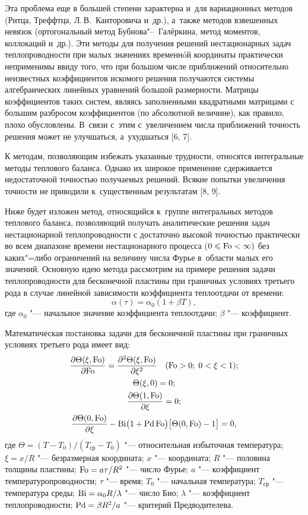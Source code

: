 Эта проблема еще в большей степени характерна и~для вариационных методов 
(Ритца, Треффтца, Л.\,В.~Канторовича и~др.), а~также методов взвешенных невязок 
(ортогональный метод Бубнова"--~Галёркина, метод моментов, коллокаций и~др.). 
Эти методы для получения решений нестационарных задач теплопроводности при 
малых значениях временн\'{o}й координаты практически неприменимы ввиду того, 
что при большом числе приближений относительно неизвестных коэффициентов 
искомого решения получаются системы алгебраических линейных уравнений 
большой размерности. Матрицы коэффициентов таких систем, являясь 
заполненными квадратными матрицами с большим разбросом коэффициентов (по 
абсолютной величине), как правило, плохо обусловлены. В~связи с~этим с~увеличением числа приближений точность решения может не улучшаться, а~ухудшаться [6, 7]. 

К методам, позволяющим избежать указанные трудности, относятся интегральные 
методы теплового баланса. Однако их широкое применение сдерживается 
недостаточной точностью получаемых решений. Всякие попытки увеличения 
точности не приводили к~существенным результатам [8, 9].

Ниже будет изложен метод, относящийся к~группе интегральных методов 
теплового баланса, позволяющий получать аналитические решения задач 
нестационарной теплопроводности с достаточно высокой точностью практически 
во всем диапазоне времени нестационарного процесса 
($0\leqslant {\rm Fo}<\infty )$ без каких"=либо ограничений на величину числа Фурье в~области 
малых его значений. Основную идею метода рассмотрим на примере решения 
задачи теплопроводности для бесконечной пластины при граничных условиях 
третьего рода в случае линейной зависимости коэффициента теплоотдачи от 
времени:
\[
\alpha (\tau)=\alpha _0 ( 1+\beta T),
\]
где $\alpha _0 $ "--- начальное значение коэффициента теплоотдачи; $\beta $ "--- 
коэффициент.

Математическая постановка задачи для бесконечной пластины при граничных 
условиях третьего рода имеет вид:
\begin{gather}
\frac{\partial \Theta (\xi, {\rm Fo})}{\partial {\rm Fo}}=
\frac{\partial^2\Theta (\xi, {\rm Fo})}{\partial \xi ^2}\quad  ({\rm Fo}>0;\; 
0<\xi <1);\\
\label{stef-eq1}
\Theta (\xi, 0)=0;
\\
\label{stef-eq2}
\frac{\partial \Theta (1, {\rm Fo} ) }{\partial \xi }=0;
\\
\label{stef-eq3}
\frac{\partial \Theta (0, {\rm Fo})} {\partial \xi }-
{\rm Bi}\bigl(1+{\rm Pd}\,{\rm Fo}\bigr)\bigl[\Theta ( 0, {\rm Fo})-1\bigr]=0,
\end{gather}
где 
$\Theta =(T-T_0)/(T_{\text{ср}} -T_0 )$ "--- относительная избыточная температура; \linebreak
$\xi =x/R$ "--- безразмерная координата; 
$x$ "--- координата; $R$ "--- половина толщины пластины; 
${\rm Fo}=a\tau /R^2$ "--- число Фурье; 
$a$ "--- коэффициент температуропроводности; 
$\tau $ "--- время; 
$T_0$ "--- начальная температура; 
$T_{\text{ср}} $ "--- температура среды; 
${\rm Bi}=\alpha _0 R /\lambda $ "--- число Био; 
$\lambda $ "--- коэффициент теплопроводности; 
${\rm Pd}=\beta R^2/a$ "--- критерий Предводителева.



